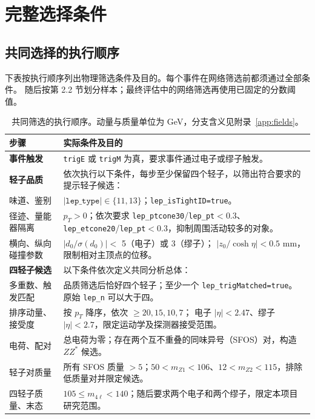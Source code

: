 \documentclass[11pt,a4paper,fontset=fandol,scheme=plain]{ctexart}
\begin{document}
\section{完整选择条件}\label{app:cuts}

\subsection{共同选择的执行顺序}
下表按执行顺序列出物理筛选条件及目的。每个事件在网络筛选前都须通过全部条件。
随后按第 2.2 节划分样本；最终评估中的网络筛选再使用已固定的分数阈值。
\begin{table}[H]
\caption{共同筛选的执行顺序。动量与质量单位为 GeV，分支含义见附录~\ref{app:fields}。}
\label{tab:cuts}
\small
\renewcommand{\arraystretch}{1.1}
\begin{tabularx}{\linewidth}{@{}p{.23\linewidth}Y@{}}
\toprule
步骤 & 实际条件及目的 \\
\midrule
\textbf{事件触发} & \texttt{trigE} 或 \texttt{trigM} 为真，要求事件通过电子或缪子触发。 \\
\midrule
\textbf{轻子品质} & 依次执行以下条件，每步至少保留四个轻子，以筛出符合要求的提示轻子候选： \\
味道、鉴别 & $|\texttt{lep\_type}|\in\{11,13\}$；\texttt{lep\_isTightID=true}。 \\
径迹、量能器隔离 & $p_T>0$；依次要求 \texttt{lep\_ptcone30}/\texttt{lep\_pt}$<0.3$、
\texttt{lep\_etcone20}/\texttt{lep\_pt}$<0.3$，抑制周围活动较多的对象。 \\
横向、纵向碰撞参数 & $|d_0/\sigma(d_0)|<$ 5（电子）或 3（缪子）；
$|z_0/\cosh\eta|<0.5$ mm，限制相对主顶点的位移。 \\
\midrule
\textbf{四轻子候选} & 以下条件依次定义共同分析总体： \\
多重数、触发匹配 & 品质筛选后恰好四个轻子；至少一个 \texttt{lep\_trigMatched=true}。
原始 \texttt{lep\_n} 可以大于四。 \\
排序动量、接受度 & 按 $p_T$ 降序，依次 $\geq20,15,10,7$；
电子 $|\eta|<2.47$、缪子 $|\eta|<2.7$，限定运动学及探测器接受范围。 \\
电荷、配对 & 总电荷为零；存在两个互不重叠的同味异号（SFOS）对，构造 $ZZ^*$ 候选。 \\
轻子对质量 & 所有 SFOS 质量 $>5$；$50<m_{Z1}<106$、$12<m_{Z2}<115$，排除低质量对并限定候选。 \\
四轻子质量、末态 & $105\leq m_{4\ell}<140$；随后要求两个电子和两个缪子，限定本项目研究范围。 \\
\bottomrule
\end{tabularx}
\end{table}
\end{document}
